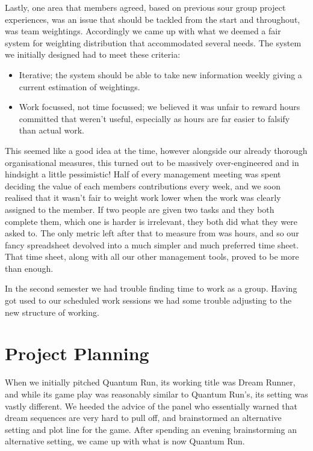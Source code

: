 \documentclass[a4paper,oneside]{memoir}
\begin{document}
			Lastly, one area that members agreed, based on previous sour group project experiences, was an issue that should be tackled from the start and throughout, was team weightings.
			Accordingly we came up with what we deemed a fair system for weighting distribution that accommodated several needs. The system we initially designed had to meet these criteria:

			\begin{itemize}
				\item Iterative; the system should be able to take new information weekly giving a current estimation of weightings.
				\item Work focussed, not time focussed; we believed it was unfair to reward hours committed that weren't useful, especially as hours are far easier to falsify than actual work.
			\end{itemize}

			This seemed like a good idea at the time, however alongside our already thorough organisational measures, this turned out to be massively over-engineered and in hindsight a little pessimistic! 
			Half of every management meeting was spent deciding the value of each members contributions every week, and we soon realised that it wasn't fair to weight work lower when the work was clearly assigned to the member. 
			If two people are given two tasks and they both complete them, which one is harder is irrelevant, they both did what they were asked to. 
			The only metric left after that to measure from was hours, and so our fancy spreadsheet devolved into a much simpler and much preferred time sheet.
			That time sheet, along with all our other management tools, proved to be more than enough.

			In the second semester we had trouble finding time to work as a group. Having got used to our scheduled work sessions we had some trouble adjusting to the new structure of working. 

	\chapter{Project Planning}

		When we initially pitched Quantum Run, its working title was Dream Runner, and while its game play was reasonably similar to Quantum Run's, its setting was vastly different.
		We heeded the advice of the panel who essentially warned that dream sequences are very hard to pull off, and brainstormed an alternative setting and plot line for the game.
		After spending an evening brainstorming an alternative setting, we came up with what is now Quantum Run.
\end{document}
